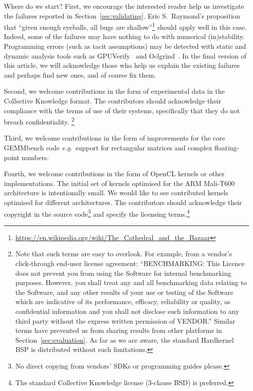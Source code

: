 \documentclass{acm_proc_article-sp} %
\begin{document}
Where do we start?
%
First, we encourage the interested reader help us investigate the failures
reported in Section~\ref{sec:validating}.
%
Eric S.\ Raymond's proposition that ``given enough eyeballs, all bugs are
shallow''\footnote{\url{https://en.wikipedia.org/wiki/The_Cathedral_and_the_Bazaar}}
should apply well in this case.
%
Indeed, some of the failures may have nothing to do with numerical
(in)stability. 
%
Programming errors (such as tacit assumptions) may be detected with static and
dynamic analysis tools such as GPUVerify~\cite{GPUVerify} and
Oclgrind~\cite{Oclgrind}.
%
In the final version of this article, we will acknowledge those who help us
explain the existing failures and perhaps find new ones, and of course fix them.

Second, we welcome contributions in the form of experimental data in the
Collective Knowledge format.
%
The contributors should acknowledge their compliance with the terms of use of
their systems, specifically that they do not breach confidentiality.%
\footnote{Note that such terms are easy to overlook. For example, from a
vendor's click-through end-user license agreement: ``BENCHMARKING: This Licence
does not prevent you from using the Software for internal benchmarking
purposes. However, you shall treat any and all benchmarking data relating to
the Software, and any other results of your use or testing of the Software
which are indicative of its performance, efficacy, reliability or quality, as
confidential information and you shall not disclose such information to any
third party without the express written permission of VENDOR.'' Similar terms
have prevented us from sharing results from other platforms in
Section~\ref{sec:evaluation}. As far as we are aware, the standard Hardkernel
BSP is distributed without such limitations.}
%

Third, we welcome contributions in the form of improvements for the core
GEMMbench code {\em e.g.}\ support for rectangular matrices and complex
floating-point numbers.

Fourth, we welcome contributions in the form of OpenCL kernels or other
implementations.
%
The initial set of kernels optimised for the ARM Mali-T600 architecture is
intentionally small.
%
We would like to see contributed kernels optimised for different architectures.
%
The contributors should acknowledge their copyright in the source
code\footnote{No direct copying from vendors' SDKs or programming guides
please.} and specify the licensing terms.\footnote{The standard Collective
Knowledge license (3-clause BSD) is preferred.}
%
\end{document}
